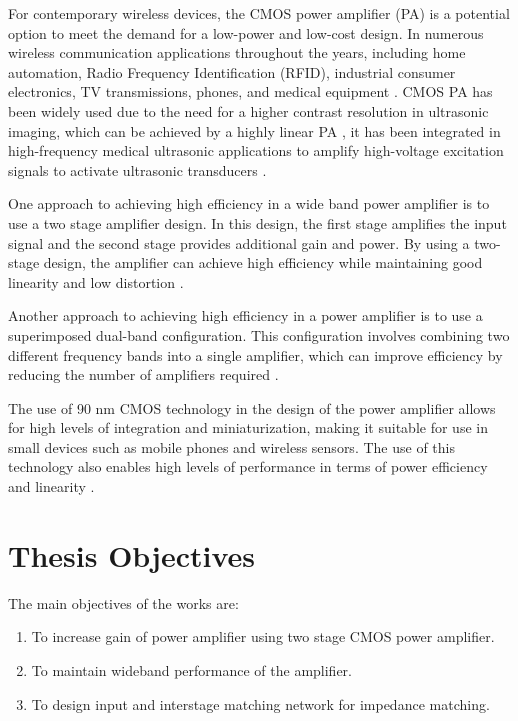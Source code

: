 For contemporary wireless devices, the CMOS power amplifier (PA) is a potential option to meet the demand for a low-power and low-cost design. In numerous wireless communication applications throughout the years, including home automation, Radio Frequency Identification (RFID), industrial consumer electronics, TV transmissions, phones, and
medical equipment \cite{fourth, fifth, seventh}. CMOS PA has been widely used due to the need for a higher contrast resolution in ultrasonic imaging, which can be achieved by a highly linear PA , it has been integrated in high-frequency medical ultrasonic applications to amplify high-voltage excitation signals to activate ultrasonic transducers \cite{sixth}.

One approach to achieving high efficiency in a wide band power amplifier is to use a two stage amplifier design. In this design, the first stage amplifies the input signal and the second
stage provides additional gain and power. By using a two-stage design, the amplifier can
achieve high efficiency while maintaining good linearity and low distortion \cite{ninth}.

Another approach to achieving high efficiency in a power amplifier is to use a superimposed dual-band configuration. This configuration involves combining two different frequency bands into a single amplifier, which can improve efficiency by reducing the number of
amplifiers required \cite{tenth}.

The use of 90 nm CMOS technology in the design of the power amplifier allows for high levels of integration and miniaturization, making it suitable for use in small devices such as mobile phones and wireless sensors. The use of this technology also enables high levels of
performance in terms of power efficiency and linearity \cite{eleventh}.

\section{Thesis Objectives}
The main objectives of the works are:
\begin{enumerate}[label=\roman*. ]
  \item To increase gain of power amplifier using two stage CMOS power amplifier.
  \item To maintain wideband performance of the amplifier.
  \item To design input and interstage matching network for impedance matching.
\end{enumerate}
 
